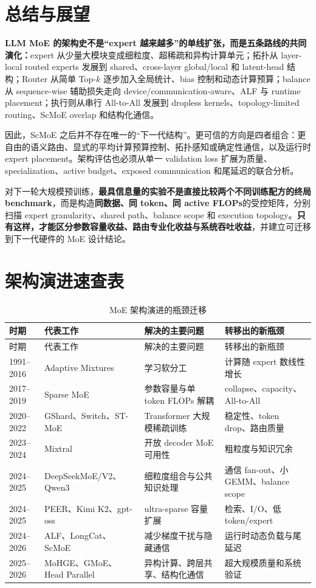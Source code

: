 \documentclass[10pt,a4paper,fontset=none]{ctexart}
\newcommand{\term}[1]{\textbf{#1}}
\def\BilingualAnchorPrefix{en}
\let\BilingualOriginalAppendix\appendix
\renewcommand{\appendix}{%
  \BilingualOriginalAppendix
  \renewcommand*{\theHsection}{\BilingualAnchorPrefix.appendix.\Alph{section}}%
}
\begin{document}
\section{总结与展望}

\term{LLM MoE 的架构史不是“expert 越来越多”的单线扩张，而是五条路线的共同演化：}expert 从少量大模块变成细粒度、超稀疏和异构计算单元；拓扑从 layer-local routed experts 发展到 shared、cross-layer global/local 和 latent-head 结构；Router 从简单 Top-$k$ 逐步加入全局统计、bias 控制和动态计算预算；balance 从 sequence-wise 辅助损失走向 device/communication-aware、ALF 与 runtime placement；执行则从串行 All-to-All 发展到 dropless kernels、topology-limited routing、ScMoE overlap 和结构化通信。

因此，ScMoE 之后并不存在唯一的“下一代结构”。更可信的方向是四者组合：更自由的语义路由、显式的平均计算预算控制、拓扑感知或确定性通信，以及运行时 expert placement。架构评估也必须从单一 validation loss 扩展为质量、specialization、active budget、exposed communication 和尾延迟的联合分析。

对下一轮大规模预训练，\term{最具信息量的实验不是直接比较两个不同训练配方的终局 benchmark}，而是构造\textbf{同数据、同 token、同 active FLOPs}的受控矩阵，分别扫描 expert granularity、shared path、balance scope 和 execution topology。\textbf{只有这样，才能区分参数容量收益、路由专业化收益与系统吞吐收益}，并建立可迁移到下一代硬件的 MoE 设计结论。

\appendix
\section{架构演进速查表}

\begin{longtable}{@{}p{}p{}p{}p{}@{}}
\caption{MoE 架构演进的瓶颈迁移}\label{zh:tab:timeline}\\
\toprule
时期 & 代表工作 & 解决的主要问题 & 转移出的新瓶颈 \\
\midrule
\endfirsthead
\toprule
时期 & 代表工作 & 解决的主要问题 & 转移出的新瓶颈 \\
\midrule
\endhead
1991--2016 & Adaptive Mixtures & 学习软分工 & 计算随 expert 数线性增长 \\
2017--2019 & Sparse MoE & 参数容量与单 token FLOPs 解耦 & collapse、capacity、All-to-All \\
2020--2022 & GShard、Switch、ST-MoE & Transformer 大规模稀疏训练 & 稳定性、token drop、路由质量 \\
2023--2024 & Mixtral & 开放 decoder MoE 可用性 & 粗粒度与知识冗余 \\
2024--2025 & DeepSeekMoE/V2、Qwen3 & 细粒度组合与公共知识处理 & 通信 fan-out、小 GEMM、balance scope \\
2024--2025 & PEER、Kimi K2、gpt-oss & ultra-sparse 容量扩展 & 检索、I/O、低 token/expert \\
2024--2026 & ALF、LongCat、ScMoE & 减少梯度干扰与隐藏通信 & 运行时动态负载与尾延迟 \\
2025--2026 & MoHGE、GMoE、Head Parallel & 异构计算、跨层共享、结构化通信 & 超大规模质量和系统验证 \\
\bottomrule
\end{longtable}
\end{document}
